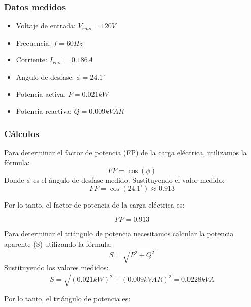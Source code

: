 \documentclass[12pt, letterpaper]{article}
\begin{document}
\subsubsection{Datos medidos}
\begin{itemize}
	\item Voltaje de entrada: $V_{rms} = 120V$
	\item Frecuencia: $f = 60Hz$
	\item Corriente: $I_{rms} = 0.186A$
	\item Angulo de desfase: $\phi = 24.1^\circ$
	\item Potencia activa: $P = 0.021 kW$
	\item Potencia reactiva: $Q = 0.009 kVAR$
\end{itemize}

\subsubsection{Cálculos}

Para determinar el factor de potencia (FP) de la carga eléctrica, utilizamos la fórmula:
\[ FP = \cos(\phi) \]
Donde \(\phi\) es el ángulo de desfase medido.
Sustituyendo el valor medido:
\[ FP = \cos(24.1^\circ) \approx 0.913 \]

Por lo tanto, el factor de potencia de la carga eléctrica es:

\begin{tcolorbox}[colback=mygray, colframe=LimeGreen, boxrule=0.7pt, arc=2pt, boxsep=1pt, left=2pt, right=2pt, top=2pt, bottom=2pt, title=Ángulo de desfase]
\begin{equation*}
	\boxed{FP = 0.913}
\end{equation*}
\end{tcolorbox}

Para determinar el triángulo de potencia necesitamos calcular la potencia aparente (S) utilizando la fórmula:
\[S = \sqrt{P^2 + Q^2}\]
Sustituyendo los valores medidos:
\[S = \sqrt{(0.021 kW)^2 + (0.009 kVAR)^2} = 0.0228 kVA\]

Por lo tanto, el triángulo de potencia es:
\begin{center}
\end{center}
\end{document}
